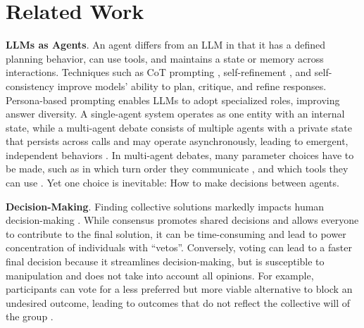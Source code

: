 \section{Related Work}



\noindent
\textbf{LLMs as Agents}. %
An agent differs from an LLM in that it has a defined planning behavior, can use tools, and maintains a state or memory across interactions. 
Techniques such as \acf{CoT} prompting \citep{wei_chain--thought_2023}, self-refinement \citep{madaan_self-refine_2023}, and self-consistency \citep{wang_self-consistency_2022} improve models' ability to plan, critique, and refine responses. 
Persona-based prompting \citep{jiang_personallm_2024} enables \acp{LLM} to adopt specialized roles, improving answer diversity.
A single-agent system operates as one entity with an internal state, while a multi-agent debate consists of multiple agents with a private state that persists across calls and may operate asynchronously, leading to emergent, independent behaviors \cite{du2023improvingfactualityreasoninglanguage, ZhaoHXL23a, XuYLW23a, SuzgunK24a, goldberg2024}.
In multi-agent debates, many parameter choices have to be made, such as in which turn order they communicate \citep{yin_exchange--thought_2023}, and which tools they can use \citep{yao2023reactsynergizingreasoningacting}.
Yet one choice is inevitable: How to make decisions between agents.



\noindent
\textbf{Decision-Making}. Finding collective solutions markedly impacts human decision-making \cite{jones_comparison_1994}. 
While consensus promotes shared decisions and allows everyone to contribute to the final solution, it can be time-consuming and lead to power concentration of individuals with ``vetos''. 
Conversely, voting can lead to a faster final decision because it streamlines decision-making, but is susceptible to manipulation and does not take into account all opinions.
For example, participants can vote for a less preferred but more viable alternative to block an undesired outcome, leading to outcomes that do not reflect the collective will of the group \citep{list_social_2022}.

